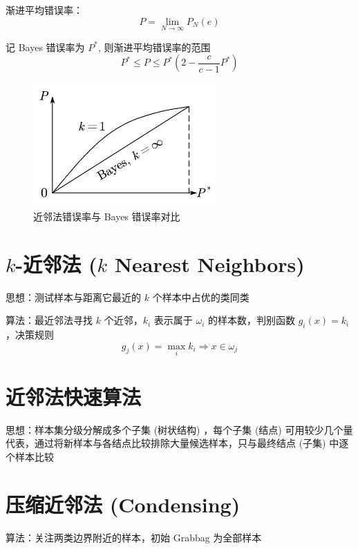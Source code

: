 \documentclass[openany]{ctexbook}
\theoremstyle{kaiti}
\theoremstyle{normal}
\begin{document}
渐进平均错误率：
\begin{equation}
P=\lim_{N\rightarrow \infty} P_N\left(e \right)
\end{equation}

记 Bayes 错误率为 $P^*$, 则渐进平均错误率的范围
\begin{equation}
P^*\leqslant P\leqslant P^*\left(2-\frac{c}{c-1}P^*\right)
\end{equation}

\begin{figure}
  \centering
  \includegraphics[width=7cm]{1627808484207-6.1-2.jpg}
  \caption{近邻法错误率与 Bayes 错误率对比}
\end{figure}

\section{\texorpdfstring{$k$}{k}-近邻法 (\texorpdfstring{$k$}{k} Nearest Neighbors)}

思想：测试样本与距离它最近的 $k$ 个样本中占优的类同类

算法：最近邻法寻找 $k$ 个近邻，$k_i$ 表示属于 $\omega_i$ 的样本数，判别函数 $g_i(x)=k_i$，决策规则
\begin{equation}
g_j(x)=\max_ik_i\Rightarrow x\in \omega_j
\end{equation}

\section{近邻法快速算法}

思想：样本集分级分解成多个子集 (树状结构) ，每个子集 (结点) 可用较少几个量代表，通过将新样本与各结点比较排除大量候选样本，只与最终结点 (子集) 中逐个样本比较

\section{压缩近邻法 (Condensing) }

算法：关注两类边界附近的样本，初始 Grabbag 为全部样本
\end{document}
